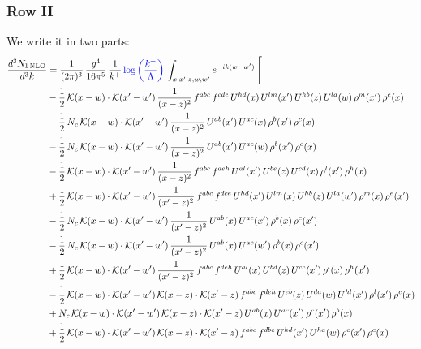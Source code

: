 \documentclass[9pt]{article}
\numberwithin{equation}{section}
\begin{document}
\subsubsection{Row II}
We write it in two parts:
\begin{align}
\frac{d^{3}N_{1\,\mathrm{NLO}}}{d^{3}k} & = \frac{1}{(2\pi)^{3}}\,\frac{g^{4}}{16\pi^{5}}\,\frac{1}{k^{+}}\,{\color{blue}\log{\left(\frac{k^{+}}{\Lambda}\right)}}\,\int_{x,x',z,w,w'}e^{-ik(w-w')}\,\Bigg[\notag\\ & -\frac{1}{2}\,\mathcal{K}(x-w)\cdot\mathcal{K}(x'-w')\,\frac{1}{(x-z)^{2}}\,f^{abc}\,f^{cde}\,U^{hd}(x)\,U^{lm}(x')\,U^{hb}(z)\,U^{la}(w)\,\rho^{m}(x')\,\rho^{e}(x)\notag\\
& -\frac{1}{2}\,N_{c}\,\mathcal{K}(x-w)\cdot\mathcal{K}(x'-w')\,\frac{1}{(x-z)^{2}}\,U^{ab}(x')\,U^{ac}(x)\,\rho^{b}(x')\,\rho^{c}(x)\notag\\
& -\frac{1}{2}\,N_{c}\,\mathcal{K}(x-w)\cdot\mathcal{K}(x'-w')\,\frac{1}{(x-z)^{2}}\,U^{ab}(x')\,U^{ac}(w)\,\rho^{b}(x')\,\rho^{c}(x)\notag\\
& -\frac{1}{2}\,\mathcal{K}(x-w)\cdot\mathcal{K}(x'-w')\,\frac{1}{(x-z)^{2}}\,f^{abc}\,f^{deh}\,U^{al}(x')\,U^{be}(z)\,U^{cd}(x)\,\rho^{l}(x')\,\rho^{h}(x)\notag\\
& +\frac{1}{2}\,\mathcal{K}(x-w)\cdot\mathcal{K}(x'-w')\,\frac{1}{(x'-z)^{2}}\,f^{abc}\,f^{dce}\,U^{hd}(x')\,U^{lm}(x)\,U^{hb}(z)\,U^{la}(w')\,\rho^{m}(x)\,\rho^{e}(x')\notag\\
& -\frac{1}{2}\,N_{c}\,\mathcal{K}(x-w)\cdot\mathcal{K}(x'-w')\,\frac{1}{(x'-z)^{2}}\,U^{ab}(x)\,U^{ac}(x')\,\rho^{b}(x)\,\rho^{c}(x')\notag\\
& -\frac{1}{2}\,N_{c}\,\mathcal{K}(x-w)\cdot\mathcal{K}(x'-w')\,\frac{1}{(x'-z)^{2}}\,U^{ab}(x)\,U^{ac}(w')\,\rho^{b}(x)\,\rho^{c}(x')\notag\\
& +\frac{1}{2}\,\mathcal{K}(x-w)\cdot\mathcal{K}(x'-w')\,\frac{1}{(x'-z)^{2}}\,f^{abc}\,f^{deh}\,U^{al}(x)\,U^{bd}(z)\,U^{ce}(x')\,\rho^{l}(x)\,\rho^{h}(x')\notag\\
& -\frac{1}{2}\,\mathcal{K}(x-w)\cdot\mathcal{K}(x'-w')\,\mathcal{K}(x-z)\cdot\mathcal{K}(x'-z)\,f^{abc}\,f^{deh}\,U^{eb}(z)\,U^{da}(w)\,U^{hl}(x')\,\rho^{l}(x')\,\rho^{c}(x)\notag\\
& +N_{c}\,\mathcal{K}(x-w)\cdot\mathcal{K}(x'-w')\,\mathcal{K}(x-z)\cdot\mathcal{K}(x'-z)\,U^{ab}(x)\,U^{ac}(x')\,\rho^{c}(x')\,\rho^{b}(x)\notag\\
& +\frac{1}{2}\,\mathcal{K}(x-w)\cdot\mathcal{K}(x'-w')\,\mathcal{K}(x-z)\cdot\mathcal{K}(x'-z)\,f^{abc}\,f^{dbe}\,U^{hd}(x')\,U^{ha}(w)\,\rho^{e}(x')\,\rho^{c}(x)\notag\\

\end{align}
\end{document}
